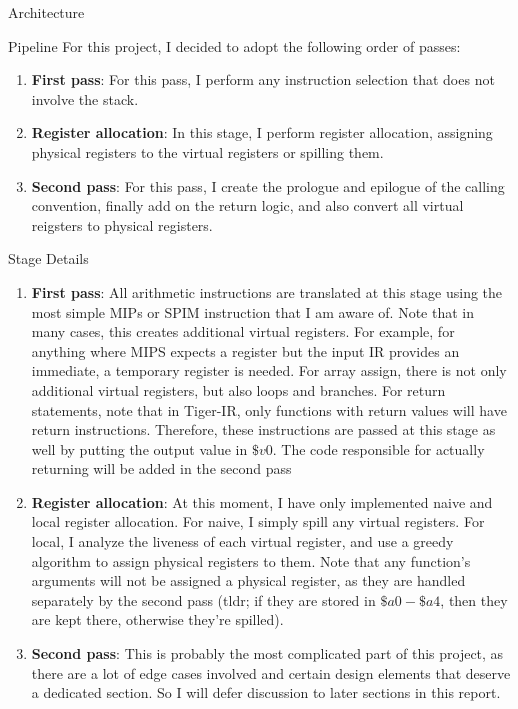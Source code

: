 \documentclass[letterpaper,12pt]{article}
\theoremstyle{definition}
\begin{document}
    \begin{section}{Architecture}
        \begin{subsection}{Pipeline}
            For this project, I decided to adopt the following order of passes:
            \begin{enumerate}
                \item \textbf{First pass}: For this pass, I perform any instruction selection that does not involve the stack.
                \item \textbf{Register allocation}: In this stage, I perform register allocation, assigning physical registers to the virtual registers or spilling them.
                \item \textbf{Second pass}: For this pass, I create the prologue and epilogue of the calling convention, finally add on the return logic, and also convert all virtual reigsters to physical registers.
            \end{enumerate}
        \end{subsection}

        \begin{subsection}{Stage Details}
            \begin{enumerate}
                \item \textbf{First pass}: All arithmetic instructions are translated at this stage using the most simple MIPs or SPIM instruction that I am aware of. Note that in many cases, this creates additional virtual registers. For example, for anything where MIPS expects a register but the input IR provides an immediate, a temporary register is needed. For array assign, there is not only additional virtual registers, but also loops and branches. For return statements, note that in Tiger-IR, only functions with return values will have return instructions. Therefore, these instructions are passed at this stage as well by putting the output value in \(\$v0\). The code responsible for actually returning will be added in the second pass
                \item \textbf{Register allocation}: At this moment, I have only implemented naive and local register allocation. For naive, I simply spill any virtual registers. For local, I analyze the liveness of each virtual register, and use a greedy algorithm to assign physical registers to them. Note that any function's arguments will not be assigned a physical register, as they are handled separately by the second pass (tldr; if they are stored in \(\$a0 - \$a4\), then they are kept there, otherwise they're spilled).
                \item \textbf{Second pass}: This is probably the most complicated part of this project, as there are a lot of edge cases involved and certain design elements that deserve a dedicated section. So I will defer discussion to later sections in this report.
            \end{enumerate}
        \end{subsection}


\end{section}
\end{document}
